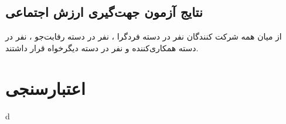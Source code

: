 \subsection{نتایج آزمون جهت‌گیری ارزش اجتماعی}
از میان همه شرکت کنندگان 
\noOfIndividualisticParticipants
نفر در دسته
فردگرا
،
\noOfCompetitiveParticipants
نفر در دسته
رفابت‌جو
،
\noOfCooperativeParticipants
نفر در دسته
همکاری‌کننده
و
\noOfAltruisticParticipants
نفر در دسته
دیگر‌خواه
قرار داشتند.
\section{اعتبارسنجی}

d
